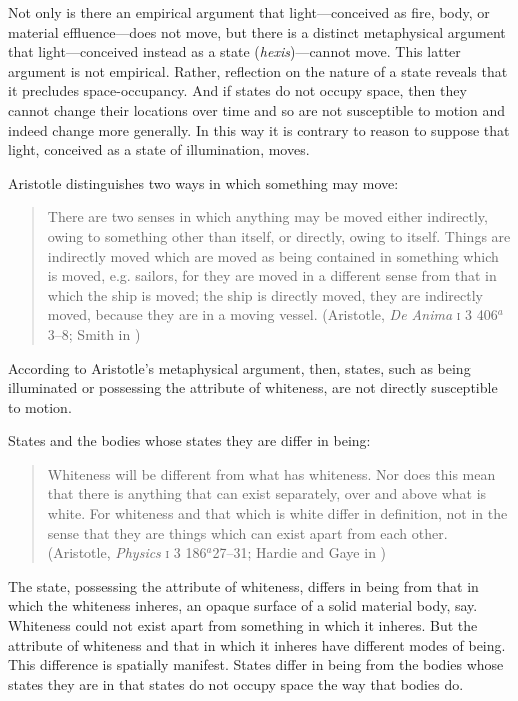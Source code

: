 Not only is there an empirical argument that light---conceived as fire, body, or material effluence---does not move, but there is a distinct metaphysical argument that light---\-con\-ceived instead as a state (\emph{hexis})---cannot move. This latter argument is not empirical. Rather, reflection on the nature of a state reveals that it precludes space-occupancy. And if states do not occupy space, then they cannot change their locations over time and so are not susceptible to motion and indeed change more generally.  In this way it is contrary to reason to suppose that light, conceived as a state of illumination, moves. 

Aristotle distinguishes two ways in which something may move: 
\begin{quote}
	There are two senses in which anything may be moved either indirectly, owing to something other than itself, or directly, owing to itself. Things are indirectly moved which are moved as being contained in something which is moved, e.g. sailors, for they are moved in a different sense from that in which the ship is moved; the ship is directly moved, they are indirectly moved, because they are in a moving vessel. (Aristotle, \emph{De Anima} \textsc{i} 3 406\( ^{a} \)3--8; Smith in \citealt[9]{Barnes:1984uq})
\end{quote}
According to Aristotle's metaphysical argument, then, states, such as being illuminated or possessing the attribute of whiteness, are not directly susceptible to motion.

States and the bodies whose states they are differ in being:
\begin{quote}
	Whiteness will be different from what has whiteness. Nor does this mean that there is anything that can exist separately, over and above what is white. For whiteness and that which is white differ in definition, not in the sense that they are things which can exist apart from each other. (Aristotle, \emph{Physics} \textsc{i} 3 186\( ^{a} \)27--31; Hardie and Gaye in \citealt[6]{Barnes:1984uq})
\end{quote}
The state, possessing the attribute of whiteness, differs in being from that in which the whiteness inheres, an opaque surface of a solid material body, say. Whiteness could not exist apart from something in which it inheres. But the attribute of whiteness and that in which it inheres have different modes of being. This difference is spatially manifest. States differ in being from the bodies whose states they are in that states do not occupy space the way that bodies do. 


